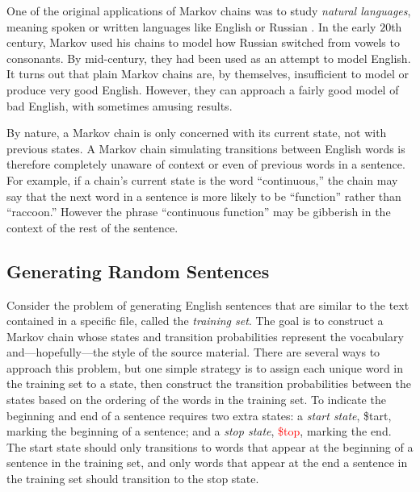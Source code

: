 One of the original applications of Markov chains was to study \emph{natural languages}, meaning spoken or written languages like English or Russian \cite{von2006five}.
In the early $20$th century, Markov used his chains to model how Russian switched from vowels to consonants.
By mid-century, they had been used as an attempt to model English.
It turns out that plain Markov chains are, by themselves, insufficient to model or produce very good English.
However, they can approach a fairly good model of bad English, with sometimes amusing results.

By nature, a Markov chain is only concerned with its current state, not with previous states.
A Markov chain simulating transitions between English words is therefore completely unaware of context or even of previous words in a sentence.
For example, if a chain's current state is the word ``continuous,'' the chain may say that the next word in a sentence is more likely to be ``function'' rather than ``raccoon.''
However the phrase ``continuous function'' may be gibberish in the context of the rest of the sentence.


\subsection*{Generating Random Sentences} %

Consider the problem of generating English sentences that are similar to the text contained in a specific file, called the \emph{training set}.
The goal is to construct a Markov chain whose states and transition probabilities represent the vocabulary and---hopefully---the style of the source material.
There are several ways to approach this problem, but one simple strategy is to assign each unique word in the training set to a state, then construct the transition probabilities between the states based on the ordering of the words in the training set.
To indicate the beginning and end of a sentence requires two extra states: a \emph{start state}, \textcolor[rgb]{0,.6,0}{\$tart}, marking the beginning of a sentence; and a \emph{stop state}, \textcolor{red}{\$top}, marking the end.
The start state should only transitions to words that appear at the beginning of a sentence in the training set, and only words that appear at the end a sentence in the training set should transition to the stop state.

